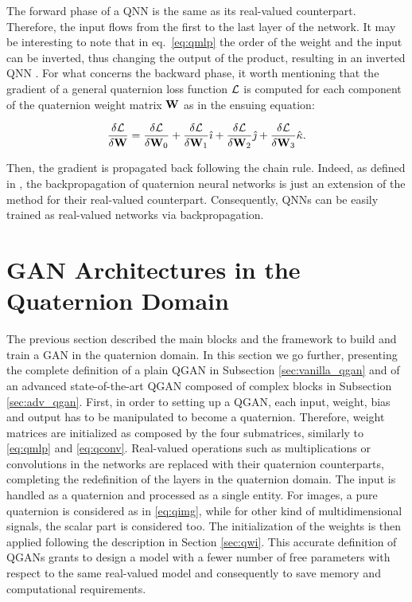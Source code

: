 \documentclass[graybox]{svmult}
\begin{document}
The forward phase of a QNN is the same as its real-valued counterpart. Therefore, the input flows from the first to the last layer of the network. It may be interesting to note that in eq.~\eqref{eq:qmlp} the order of the weight and the input can be inverted, thus changing the output of the product, resulting in an inverted QNN \cite{ParcolletAIR2019, ParcolletICLR2019}.
For what concerns the backward phase, it worth mentioning that the gradient of a general quaternion loss function ${\cal L}$ is computed for each component of the quaternion weight matrix ${\mathbf W}$ as in the ensuing equation:

\begin{equation}
    \frac{\delta {\cal L}}{\delta {\mathbf W}} = \frac{\delta {\cal L}}{\delta {\mathbf W}_0} + \frac{\delta {\cal L}}{\delta {\mathbf W}_1} {\hat{\imath}} + \frac{\delta {\cal L}}{\delta {\mathbf W}_2} {\hat{\jmath}} + \frac{\delta {\cal L}}{\delta {\mathbf W}_3} {\hat{\kappa}}.
\end{equation}


Then, the gradient is propagated back following the chain rule. Indeed, as defined in \cite{ParcolletAIR2019}, the backpropagation of quaternion neural networks is just an extension of the method for their real-valued counterpart. Consequently, QNNs can be easily trained as real-valued networks via backpropagation.


\section{GAN Architectures in the Quaternion Domain}
\label{sec:qgan}
\noindent The previous section described the main blocks and the framework to build and train a GAN in the quaternion domain. In this section we go further, presenting the complete definition of a plain QGAN in Subsection \ref{sec:vanilla_qgan} and of an advanced state-of-the-art QGAN composed of complex blocks in Subsection \ref{sec:adv_qgan}.
First, in order to setting up a QGAN, each input, weight, bias and output has to be manipulated to become a quaternion. Therefore, weight matrices are initialized as composed by the four submatrices, similarly to \eqref{eq:qmlp} and \eqref{eq:qconv}. Real-valued operations such as multiplications or convolutions in the networks are replaced with their quaternion counterparts, completing the redefinition of the layers in the quaternion domain. The input is handled as a quaternion and processed as a single entity. For images, a pure quaternion is considered as in \eqref{eq:qimg}, while for other kind of multidimensional signals, the scalar part is considered too. The initialization of the weights is then applied following the description in Section \ref{sec:qwi}. This accurate definition of QGANs grants to design a model with a fewer number of free parameters with respect to the same real-valued model and consequently to save memory and computational requirements.
\end{document}
